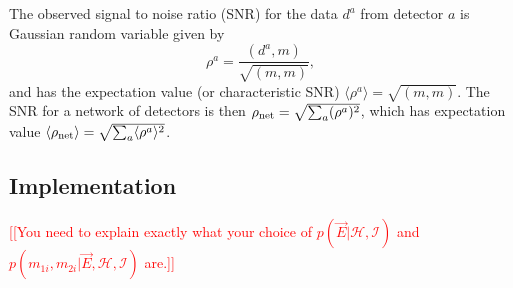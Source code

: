 \documentclass[twocolumn,prd,amssymb,aps,nofootinbib,showpacs,epsf]{revtex4}
\newcommand{\red}{\textcolor{red}}
\begin{document}
The observed signal to noise ratio (SNR) for the data $d^a$ from detector $a$ is Gaussian random variable given by
\begin{equation}
\rho^a = \frac{(d^a, m)}{\sqrt{(m, m)}},
\end{equation}
and has the expectation value (or characteristic SNR) $\langle \rho^a \rangle = \sqrt{(m, m)}$. The SNR for a network of detectors is then $\rho_{\rm net} = \sqrt{\sum_a(\rho^a)^2}$, which has expectation value $\langle \rho_{\rm net} \rangle = \sqrt{\sum_a\langle \rho^a \rangle^2}$.

\subsection{Implementation}

\red{[[You need to explain exactly what your choice of $p(\vec E | \mathcal{H},\mathcal{I})$ and $ p(m_{1i}, m_{2i} | \vec E, \mathcal{H},\mathcal{I})$ are.]]}
\end{document}
